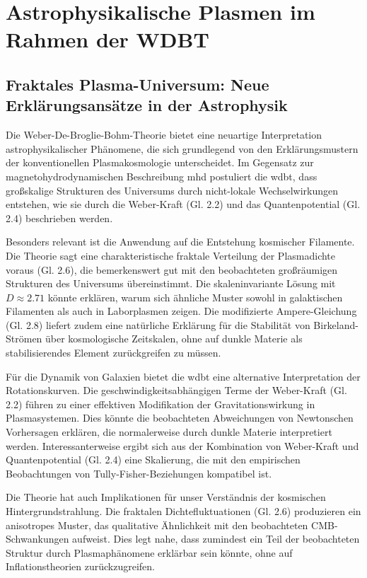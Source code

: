 \chapter{Astrophysikalische Plasmen im Rahmen der WDBT}
\section{Fraktales Plasma-Universum: Neue Erklärungsansätze in der Astrophysik}
Die Weber-De-Broglie-Bohm-Theorie bietet eine neuartige Interpretation astrophysikalischer Phänomene, die sich grundlegend von den Erklärungsmustern der konventionellen
Plasmakosmologie unterscheidet. Im Gegensatz zur magnetohydrodynamischen Beschreibung \gls{mhd} postuliert die \gls{wdbt}, dass großskalige Strukturen des Universums durch nicht-lokale
Wechselwirkungen entstehen, wie sie durch die Weber-Kraft (Gl. 2.2) und das Quantenpotential (Gl. 2.4) beschrieben werden.

Besonders relevant ist die Anwendung auf die Entstehung kosmischer Filamente. Die Theorie sagt eine charakteristische fraktale Verteilung der Plasmadichte voraus (Gl. 2.6), die
bemerkenswert gut mit den beobachteten großräumigen Strukturen des Universums übereinstimmt. Die skaleninvariante Lösung mit $D \approx 2.71$ könnte erklären, warum sich ähnliche
Muster sowohl in galaktischen Filamenten als auch in Laborplasmen zeigen. Die modifizierte Ampere-Gleichung (Gl. 2.8) liefert zudem eine natürliche Erklärung für die Stabilität
von Birkeland-Strömen über kosmologische Zeitskalen, ohne auf dunkle Materie als stabilisierendes Element zurückgreifen zu müssen.

Für die Dynamik von Galaxien bietet die \gls{wdbt} eine alternative Interpretation der Rotationskurven. Die geschwindigkeitsabhängigen Terme der Weber-Kraft (Gl. 2.2) führen zu
einer effektiven Modifikation der Gravitationswirkung in Plasmasystemen. Dies könnte die beobachteten Abweichungen von Newtonschen Vorhersagen erklären, die normalerweise durch
dunkle Materie interpretiert werden. Interessanterweise ergibt sich aus der Kombination von Weber-Kraft und Quantenpotential (Gl. 2.4) eine Skalierung, die mit den empirischen
Beobachtungen von Tully-Fisher-Beziehungen kompatibel ist.

Die Theorie hat auch Implikationen für unser Verständnis der kosmischen Hintergrundstrahlung. Die fraktalen Dichtefluktuationen (Gl. 2.6) produzieren ein anisotropes Muster, das
qualitative Ähnlichkeit mit den beobachteten CMB-Schwankungen aufweist. Dies legt nahe, dass zumindest ein Teil der beobachteten Struktur durch Plasmaphänomene erklärbar sein
könnte, ohne auf Inflationstheorien zurückzugreifen.

